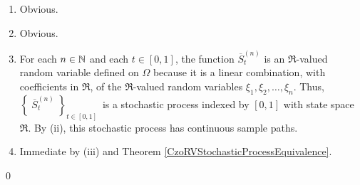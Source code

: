 \begin{enumerate}
\item	Obvious.
\item	Obvious.
\item	For each $n \in \mathbb{N}$ and each $t \in [0,1]$, the function $\overline{S}^{(n)}_{t}$ is
		an $\Re$-valued random variable defined on $\Omega$ because it is a linear
		combination, with coefficients in $\Re$, of the $\Re$-valued random variables
		$\xi_{1}, \xi_{2}, \ldots, \xi_{n}$.
		Thus, \,$\left\{\;\overline{S}^{(n)}_{t}\;\right\}_{t\in[0,1]}$\,
		is a stochastic process indexed by $[0,1]$ with state space $\Re$.
		By (ii), this stochastic process has continuous sample paths.
\item	Immediate by (iii) and Theorem \ref{CzoRVStochasticProcessEquivalence}.
\end{enumerate}
\qed

